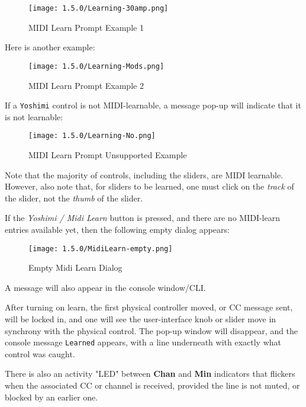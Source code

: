 \begin{figure}[H]
   \centering
   \texttt{[image: 1.5.0/Learning-30amp.png]}
   \caption{MIDI Learn Prompt Example 1}
   \label{fig:midi_learn_ex_1}
\end{figure}

   Here is another example:

\begin{figure}[H]
   \centering
   \texttt{[image: 1.5.0/Learning-Mods.png]}
   \caption{MIDI Learn Prompt Example 2}
   \label{fig:midi_learn_ex_2}
\end{figure}

   If a \texttt{Yoshimi} control is not MIDI-learnable, a message pop-up
   will indicate that it is not
   learnable:

\begin{figure}[H]
   \centering
   \texttt{[image: 1.5.0/Learning-No.png]}
   \caption{MIDI Learn Prompt Unsupported Example}
   \label{fig:midi_learn_unsupported}
\end{figure}

   Note that the majority of controls, including the sliders, are MIDI
   learnable.  However, also note that, for sliders to be learned, one must
   click on the \textsl{track} of the slider, not the \textsl{thumb} of the
   slider.

   If the \textsl{Yoshimi / Midi Learn} button is pressed, and there are no
   MIDI-learn entries available yet, then the following empty dialog appears:

\begin{figure}[H]
   \centering
   \texttt{[image: 1.5.0/MidiLearn-empty.png]}
   \caption{Empty Midi Learn Dialog}
   \label{fig:empty_midi_learn_dialog}
\end{figure}

   A message will also appear in the console window/CLI.

   After turning on learn, the first physical controller moved, or CC message
   sent, will be locked in, and one will see the user-interface knob or slider
   move in synchrony with the physical control. The pop-up window will
   disappear, and the console message \texttt{Learned} appears, with a line
   underneath with exactly what control was caught.

   There is also an activity "LED" between \textbf{Chan} and
   \textbf{Min} indicators that flickers when the associated CC or channel
   is received, provided the line is not muted, or blocked by an earlier one.

